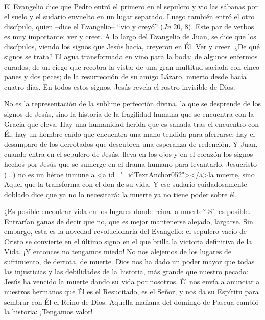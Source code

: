 			\begin{body}El Evangelio dice que Pedro entró el primero en el sepulcro y vio las sábanas por el suelo y el sudario envuelto en un lugar separado. Luego también entró el otro discípulo, quien –dice el Evangelio– “vio y creyó” (\textit{Jn }20, 8). Este par de verbos es muy importante: ver y creer. A lo largo del Evangelio de Juan, se dice que los discípulos, viendo los signos que Jesús hacía, creyeron en Él. Ver y creer. ¿De qué signos se trata? El agua transformada en vino para la boda; de algunos enfermos curados; de un ciego que recobra la vista; de una gran multitud saciada con cinco panes y dos peces; de la resurrección de su amigo Lázaro, muerto desde hacía cuatro días. En todos estos signos, Jesús revela el rostro invisible de Dios.\end{body}
			
			\begin{body}No es la representación de la sublime perfección divina, la que se desprende de los signos de Jesús, sino la historia de la fragilidad humana que se encuentra con la Gracia que eleva. Hay una humanidad herida que es sanada tras el encuentro con Él; hay un hombre caído que encuentra una mano tendida para aferrarse; hay el desamparo de los derrotados que descubren una esperanza de redención. Y Juan, cuando entra en el sepulcro de Jesús, lleva en los ojos y en el corazón los signos hechos por Jesús que se sumerge en el drama humano para levantarlo. Jesucristo (...) no es un héroe inmune a <a id="_idTextAnchor052"></a>la muerte, sino Aquel que la transforma con el don de su vida. Y ese sudario cuidadosamente doblado dice que ya no lo necesitará: la muerte ya no tiene poder sobre él.\end{body}
			
			\begin{body}[...] ¿Es posible encontrar vida en los lugares donde reina la muerte? Sí, es posible. Entrarían ganas de decir que no, que es mejor mantenerse alejado, largarse. Sin embargo, esta es la novedad revolucionaria del Evangelio: el sepulcro vacío de Cristo se convierte en el último signo en el que brilla la victoria definitiva de la Vida. ¡Y entonces no tengamos miedo! No nos alejemos de los lugares de sufrimiento, de derrota, de muerte. Dios nos ha dado un poder mayor que todas las injusticias y las debilidades de la historia, más grande que nuestro pecado: Jesús ha vencido la muerte dando su vida por nosotros. Él nos envía a anunciar a nuestros hermanos que Él es el Resucitado, es el Señor, y nos da su Espíritu para sembrar con Él el Reino de Dios. Aquella mañana del domingo de Pascua cambió la historia: ¡Tengamos valor!\end{body}
			
